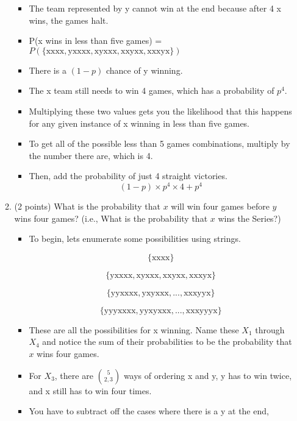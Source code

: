 \documentclass[11pt]{article}
\begin{document}
\begin{enumerate}
\begin{enumerate}
\begin{itemize}
		\item The team represented by y cannot win at the end because after 4 x wins, the games halt.
		\item P(x wins in less than five games) = $P(\mathrm{\{xxxx, yxxxx, xyxxx, xxyxx, xxxyx\}})$
		\item There is a $(1 - p)$ chance of y winning.
		\item The x team still needs to win 4 games, which has a probability of $p^4$.
		\item Multiplying these two values gets you the likelihood that this happens for any given instance of x winning in less than five games.
		\item To get all of the possible less than 5 games combinations, multiply by the number there are, which is 4.
		\item Then, add the probability of just 4 straight victories.
		\[(1 - p) \times p^4 \times 4 + p^4\]
		
	\end{itemize}
	
	\item (2 points) What is the probability that $x$ will win four games before
	$y$ wins four games?  (i.e., What is the probability that $x$ wins
	the Series?)
	
	\begin {itemize}
	
		\item To begin, lets enumerate some possibilities using strings.
		
		\[ \{\mathrm{xxxx}\} \]
		
		\[\{\mathrm{yxxxx,
		xyxxx,
		xxyxx,
		xxxyx}\}\]
		
		\[\{\mathrm{yyxxxx,
		yxyxxx,
		...,
		xxxyyx}\}\]
		
		\[\{\mathrm{yyyxxxx,
		yyxyxxx,
		...,
		xxxyyyx}\}\]
		
		\item These are all the possibilities for x winning. Name these $X_1$ through $X_4$ and 
			  notice the sum of their probabilities to be the probability that $x$ wins four games.
			  
		\item For $X_3$, there are ${5 \choose 2,3}$ ways of ordering x and y, y has to win twice, and x still has to win four times.
		\item You have to subtract off the cases where there is a y at the end, 
		

\end{itemize}
\end{enumerate}
\end{enumerate}
\end{document}
